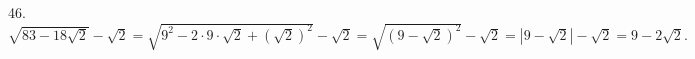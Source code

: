 46. $\sqrt{83-18\sqrt{2}}-\sqrt{2}=\sqrt{9^2-2\cdot9\cdot\sqrt{2}+(\sqrt{2})^2}-\sqrt{2}=\sqrt{(9-\sqrt{2})^2}-\sqrt{2}=|9-\sqrt{2}|-\sqrt{2}=9-2\sqrt{2}.$\\
